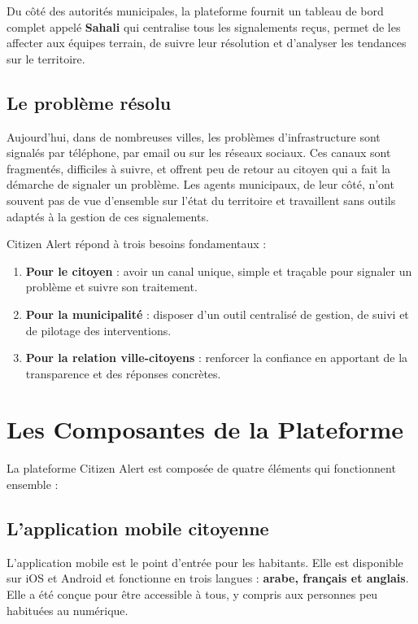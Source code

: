 \documentclass[12pt, a4paper]{article}
\begin{document}
Du côté des autorités municipales, la plateforme fournit un tableau de bord complet appelé \textbf{Sahali} qui centralise tous les signalements reçus, permet de les affecter aux équipes terrain, de suivre leur résolution et d'analyser les tendances sur le territoire.

\subsection{Le problème résolu}

Aujourd'hui, dans de nombreuses villes, les problèmes d'infrastructure sont signalés par téléphone, par email ou sur les réseaux sociaux. Ces canaux sont fragmentés, difficiles à suivre, et offrent peu de retour au citoyen qui a fait la démarche de signaler un problème. Les agents municipaux, de leur côté, n'ont souvent pas de vue d'ensemble sur l'état du territoire et travaillent sans outils adaptés à la gestion de ces signalements.

Citizen Alert répond à trois besoins fondamentaux :

\begin{enumerate}[leftmargin=*, label=\textbf{\arabic*.}]
  \item \textbf{Pour le citoyen} : avoir un canal unique, simple et traçable pour signaler un problème et suivre son traitement.
  \item \textbf{Pour la municipalité} : disposer d'un outil centralisé de gestion, de suivi et de pilotage des interventions.
  \item \textbf{Pour la relation ville-citoyens} : renforcer la confiance en apportant de la transparence et des réponses concrètes.
\end{enumerate}

\section{Les Composantes de la Plateforme}

La plateforme Citizen Alert est composée de quatre éléments qui fonctionnent ensemble :

\subsection{L'application mobile citoyenne}

L'application mobile est le point d'entrée pour les habitants. Elle est disponible sur iOS et Android et fonctionne en trois langues : \textbf{arabe, français et anglais}. Elle a été conçue pour être accessible à tous, y compris aux personnes peu habituées au numérique.
\end{document}
